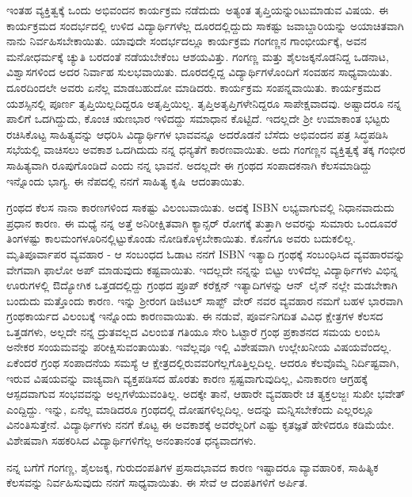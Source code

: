 {ಇಂತಹ ವ್ಯಕ್ತಿತ್ವಕ್ಕೆ ಒಂದು ಅಭಿವಂದನ ಕಾರ್ಯಕ್ರಮ \hbox{ನಡೆದುದು ಅತ್ಯಂತ} ತೃಪ್ತಿ\-ಯನ್ನುಂಟುಮಾಡುವ ವಿಷಯ. ಈ ಕಾರ್ಯಕ್ರಮದ ಸಂದರ್ಭದಲ್ಲಿ ಉಳಿದ ವಿದ್ಯಾರ್ಥಿ\-ಗಳೆಲ್ಲ ದೂರದಲ್ಲಿದ್ದುದು ಸಾಕಷ್ಟು ಜವಾಬ್ದಾರಿಯನ್ನು ಅಯಾಚಿತ\-ವಾಗಿ ನಾನು ನಿರ್ವಹಿಸಬೇಕಾಯಿತು. ಯಾವುದೇ ಸಂದರ್ಭದಲ್ಲೂ ಕಾರ್ಯಕ್ರಮ ಗಂಗಣ್ಣನ \hbox{ಗಾಂಭೀರ್ಯಕ್ಕೆ,} ಅವನ ಮನೋಧರ್ಮಕ್ಕೆ ಚ್ಯುತಿ ಬರದಂತೆ ನಡೆಯಬೇಕೆಂಬ ಆಶಯವಿತ್ತು. ಗಂಗಣ್ಣ ಮತ್ತು ಶೈಲಜಕ್ಕನೊಡನಿದ್ದ ಒಡನಾಟ, ವಿಶ್ವಾಸಗಳಿಂದ ಅದರ \hbox{ನಿರ್ವಾಹ} ಸುಲಭವಾಯಿತು. ದೂರದಲ್ಲಿದ್ದ ವಿದ್ಯಾರ್ಥಿಗಳೊಂದಿಗೆ ಸಂವಹನ ಸಾಧ್ಯವಾಯಿತು. ದೂರದಿಂದಲೇ ಅವರು ಏನೆಲ್ಲ ಮಾಡಬಹುದೋ ಮಾಡಿದರು. ಕಾರ್ಯಕ್ರಮ ಸಂಪನ್ನವಾಯಿತು. ಕಾರ್ಯಕ್ರಮದ ಯಶಸ್ಸಿನಲ್ಲಿ ಪೂರ್ಣ ತೃಪ್ತಿಯಿಲ್ಲದಿದ್ದರೂ  ಅತೃಪ್ತಿಯಿಲ್ಲ. ತೃಪ್ತಿ\enginline{-}ಅತೃಪ್ತಿಗಳೇನಿದ್ದರೂ ಸಾಪೇಕ್ಷವಾದವು. ಅಷ್ಟಾದರೂ ನನ್ನ ಪಾಲಿಗೆ ಒದಗಿದ್ದುದು, ಕೊಂಚ ಋಣಭಾರ ಇಳಿದದ್ದು ಸಮಾಧಾನ ಕೊಟ್ಟಿದೆ. ಇದಲ್ಲದೇ ಶ್ರೀ ಉಮಾಕಾಂತ ಭಟ್ಟರು ರಚಿಸಿಕೊಟ್ಟ ಸಾಹಿತ್ಯವನ್ನು ಆಧರಿಸಿ ವಿದ್ಯಾರ್ಥಿಗಳ ಭಾವವನ್ನೂ \hbox{ಅದರೊಡನೆ}  ಬೆಸೆದು ಅಭಿವಂದನ ಪತ್ರ ಸಿದ್ಧಪಡಿಸಿ ಸಭೆಯಲ್ಲಿ ವಾಚಿಸಲು ಅವಕಾಶ ಒದಗಿದುದು ನನ್ನ ಧನ್ಯತೆಗೆ ಕಾರಣವಾಯಿತು. ಅದು ಗಂಗಣ್ಣನ ವ್ಯಕ್ತಿತ್ವಕ್ಕೆ ತಕ್ಕ ಗಂಭೀರ ಸಾಹಿತ್ಯವಾಗಿ ರೂಪುಗೊಂಡಿದೆ ಎಂದು ನನ್ನ ಭಾವನೆ. ಅದಲ್ಲದೇ ಈ ಗ್ರಂಥದ ಸಂಪಾದಕನಾಗಿ ಕೆಲಸ\-ಮಾಡಿದ್ದು ಇನ್ನೊಂದು ಭಾಗ್ಯ. ಈ ನೆಪದಲ್ಲಿ ನನಗೆ  ಸಾಹಿತ್ಯ \hbox{ಕೃಷಿ ಆದಂತಾಯಿತು.} 

ಗ್ರಂಥದ ಕೆಲಸ ನಾನಾ ಕಾರಣಗಳಿಂದ ಸಾಕಷ್ಟು ವಿಲಂಬವಾಯಿತು. ಅದಕ್ಕೆ ISBN ಲಭ್ಯವಾಗುವಲ್ಲಿ ನಿಧಾನವಾದುದು ಪ್ರಧಾನ ಕಾರಣ. ಈ ಮಧ್ಯೆ ನನ್ನ ಅತ್ತೆ ಅನಿರೀಕ್ಷಿತವಾಗಿ ಕ್ಯಾನ್ಸರ್ ರೋಗಕ್ಕೆ ತುತ್ತಾಗಿ ಅವರನ್ನು ಸುಮಾರು ಒಂದೂವರೆ ತಿಂಗಳಷ್ಟು ಕಾಲ\break ಮಂಗಳೂರಿನಲ್ಲಿಟ್ಟುಕೊಂಡು ನೋಡಿಕೊಳ್ಳಬೇಕಾಯಿತು. ಕೊನೆಗೂ ಅವರು ಬದುಕ\-ಲಿಲ್ಲ. ಮೃತಿಪೂರ್ವಾಪರ ವ್ಯವಹಾರ - ಆ ಸಂಬಂಧದ ಓಡಾಟ ನನಗೆ ISBN ಇತ್ಯಾದಿ ಗ್ರಂಥಕ್ಕೆ ಸಂಬಂಧಿಸಿದ ವ್ಯವಹಾರವನ್ನು ವೇಗವಾಗಿ ಫಾಲೋ ಅಪ್ ಮಾಡುವುದು \hbox{ಕಷ್ಟವಾಯಿತು.} ಇದಲ್ಲದೇ ನನ್ನನ್ನು ಬಿಟ್ಟು ಉಳಿದೆಲ್ಲ ವಿದ್ಯಾರ್ಥಿಗಳು ವಿಭಿನ್ನ ಊರು\-ಗಳಲ್ಲಿ ಔದ್ಯೋಗಿಕ ಒತ್ತಡದಲ್ಲಿದ್ದು ಗ್ರಂಥದ ಪ್ರೂಪ್ \hbox{ಕರೆಕ್ಷನ್} \hbox{ಇತ್ಯಾದಿಗಳನ್ನು} \hbox{ಆನ್ ಲೈನ್} ನಲ್ಲೇ ಮಡಬೇಕಾಗಿ ಬಂದುದು ಮತ್ತೊಂದು ಕಾರಣ. ಇನ್ನು \hbox{ಶ್ರೀರಂಗ} \hbox{ಡಿಜಿಟಲ್} \hbox{ಸಾಪ್ಟ್ ವೇರ್} ನವರ ವ್ಯವಹಾರ ನಮಗೆ ಬಹಳ \hbox{ಭಾರವಾಗಿ} ಗ್ರಂಥ\-ಕಾರ್ಯದ \hbox{ವಿಲಂಬಕ್ಕೆ} ಇನ್ನೊಂದು ಕಾರಣವಾಯಿತು. ಈ ನಡುವೆ, ಪೂರ್ವನಿಗದಿತ ವಿವಿಧ ಕ್ಷೇತ್ರಗಳ \hbox{ಕೆಲಸದ} ಒತ್ತಡಗಳು, ಅಲ್ಲದೇ ನನ್ನ \hbox{ದ್ರುತವಲ್ಲದ} ವಿಲಂಬಿತ ಗತಿಯೂ ಸೇರಿ \hbox{ಓಟ್ಟಾರೆ} ಗ್ರಂಥ \hbox{ಪ್ರಕಾಶನದ} ಸಮಯ ಲಂಬಿಸಿ ಅನೇಕರ \hbox{ಸಂಯಮವನ್ನು} \hbox{ಪರೀಕ್ಷಿಸುವಂತಾಯಿತು.} ಇವೆಲ್ಲವೂ ಇಲ್ಲಿ ವಿಶೇಷವಾಗಿ \hbox{ಉಲ್ಲೇಖನೀಯ} ವಿಷಯ\-ವೆಂದಲ್ಲ. ಏಕೆಂದರೆ ಗ್ರಂಥ ಸಂಪಾದನೆಯ ಸಮಸ್ಯೆ ಆ \hbox{ಕ್ಷೇತ್ರದಲ್ಲಿರುವವರಿಗೆಲ್ಲ}\break ಗೊತ್ತಿಲ್ಲದಿಲ್ಲ. ಆದರೂ ಕೆಲವೊಮ್ಮೆ ನಿರ್ದಿಷ್ಟವಾಗಿ, ಇರುವ ವಿಷಯ\-ವನ್ನು  \hbox{ವಾಚ್ಯವಾಗಿ} ವ್ಯಕ್ತಪಡಿಸದ ಹೊರತು ಕಾರಣ ಸ್ಪಷ್ಟವಾಗುವುದಿಲ್ಲ, ವಿನಾಕಾರಣ ಆಗ್ರಹಕ್ಕೆ ಆಸ್ಪದವಾಗುವ ಸಂಭವವನ್ನು ಅಲ್ಲಗಳೆಯುವಂತಿಲ್ಲ. ಅದಕ್ಕೇ ತಾನೆ, ಆಹಾರೇ ವ್ಯವಹಾರೇ ಚ ತ್ಯಕ್ತ\-ಲಜ್ಜಃ \hbox{ಸುಖೀ} ಭವೇತ್ ಎಂದ್ದಿದ್ದು. ಇನ್ನು, ಏನೆಲ್ಲ ಮಾಡಿದರೂ ಗ್ರಂಥದಲ್ಲಿ \hbox{ದೋಷಗಳಿಲ್ಲದಿಲ್ಲ.} ಅದನ್ನು ಮನ್ನಿಸಬೇಕೆಂದು ಎಲ್ಲರಲ್ಲೂ ವಿನಂತಿಸುತ್ತೇನೆ. ವಿದ್ಯಾರ್ಥಿಗಳು  ನನಗೆ ಕೊಟ್ಟ ಈ ಅವಕಾಶಕ್ಕೆ  ಅವರೆಲ್ಲರಿಗೆ  ಎಷ್ಟು  ಕೃತಜ್ಞತೆ ಹೇಳಿದರೂ ಕಡಿಮೆಯೇ. ವಿಶೇಷವಾಗಿ ಸಹಕರಿಸಿದ \hbox{ವಿದ್ಯಾರ್ಥಿಗಳಿಗೆಲ್ಲ} ಅನಂತಾನಂತ ಧನ್ಯವಾದಗಳು.

ನನ್ನ ಬಗೆಗೆ ಗಂಗಣ್ಣ, ಶೈಲಜಕ್ಕ, ಗುರುದಂಪತಿಗಳ ಪ್ರಸಾದಭಾವದ ಕಾರಣ \hbox{ಇಷ್ಟಾದರೂ} ವ್ಯಾವಹಾರಿಕ, ಸಾಹಿತ್ಯಿಕ ಕೆಲಸವನ್ನು  ನಿರ್ವಹಿಸುವುದು ನನಗೆ ಸಾಧ್ಯ\-ವಾಯಿತು. ಈ ಸೇವೆ ಆ ದಂಪತಿಗಳಿಗೆ ಅರ್ಪಿತ.

\articleend
}
